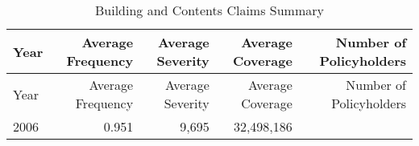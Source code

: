 \documentclass[]{book}
\theoremstyle{definition}
\theoremstyle{definition}
\theoremstyle{definition}
\theoremstyle{remark}
\begin{document}
\begin{longtable}[]{@{}lrrrr@{}}
\caption{\label{tab:CoverageBCIM} Building and Contents Claims
Summary}\tabularnewline
\toprule
\begin{minipage}[b]{0.17\columnwidth}\raggedright\strut
Year\strut
\end{minipage} & \begin{minipage}[b]{0.14\columnwidth}\raggedleft\strut
Average Frequency\strut
\end{minipage} & \begin{minipage}[b]{0.17\columnwidth}\raggedleft\strut
Average Severity\strut
\end{minipage} & \begin{minipage}[b]{0.16\columnwidth}\raggedleft\strut
Average Coverage\strut
\end{minipage} & \begin{minipage}[b]{0.16\columnwidth}\raggedleft\strut
Number of Policyholders\strut
\end{minipage}\tabularnewline
\midrule
\endfirsthead
\toprule
\begin{minipage}[b]{0.17\columnwidth}\raggedright\strut
Year\strut
\end{minipage} & \begin{minipage}[b]{0.14\columnwidth}\raggedleft\strut
Average Frequency\strut
\end{minipage} & \begin{minipage}[b]{0.17\columnwidth}\raggedleft\strut
Average Severity\strut
\end{minipage} & \begin{minipage}[b]{0.16\columnwidth}\raggedleft\strut
Average Coverage\strut
\end{minipage} & \begin{minipage}[b]{0.16\columnwidth}\raggedleft\strut
Number of Policyholders\strut
\end{minipage}\tabularnewline
\midrule
\endhead
\begin{minipage}[t]{0.17\columnwidth}\raggedright\strut
2006\strut
\end{minipage} & \begin{minipage}[t]{0.14\columnwidth}\raggedleft\strut
0.951\strut
\end{minipage} & \begin{minipage}[t]{0.17\columnwidth}\raggedleft\strut
9,695\strut
\end{minipage} & \begin{minipage}[t]{0.16\columnwidth}\raggedleft\strut
32,498,186\strut
\end{minipage} & \begin{minipage}[t]{0.16\columnwidth}\raggedleft\strut

\end{minipage}
\end{longtable}
\end{document}
